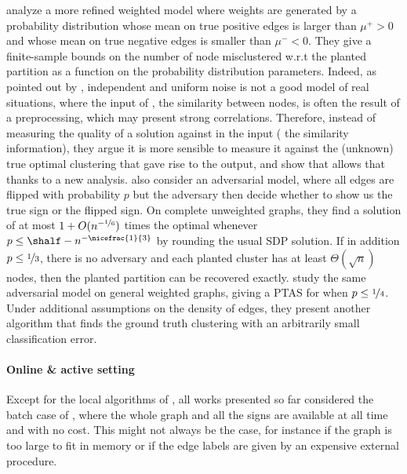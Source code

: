 \Textcite{Joachims2005} analyze a more refined weighted model where weights are generated by a
probability distribution whose mean on true positive edges is larger than $\mu^+>0$ and whose mean
on true negative edges is smaller than $\mu^-<0$. They give a finite-sample bounds on the number of
node misclustered w.r.t the planted partition as a function on the probability distribution
parameters. Indeed, as pointed out by \textcite{plantedAilon09}, independent and uniform noise is
not a good model of real situations, where the input of \pcc{}, \ie{} the similarity between nodes,
is often the result of a preprocessing, which may present strong correlations. Therefore, instead of
measuring the quality of a solution against in the input (\ie{} the similarity information), they
argue it is more sensible to measure it against the (unknown) true optimal clustering that gave rise
to the output, and show that \ccpivot{} allows that thanks to a new analysis. \Textcite{Mathieu2010}
also consider an adversarial model, where all edges are flipped with probability $p$ but the
adversary then decide whether to show us the true sign or the flipped sign. On complete unweighted
graphs, they find a solution of \mind{} at most $1 + O(n^{-\nicefrac{1}{6}})$ times the optimal
whenever $p \leq \shalf - n^{-\nicefrac{1}{3}}$ by rounding the usual SDP solution. If in addition
$p\leq\nicefrac{1}{3}$, there is no adversary and each planted cluster has at least
$\Theta(\sqrt{n})$ nodes, then the planted partition can be recovered exactly.
\Textcite{Makarychev2014} study the same adversarial model on general weighted graphs, giving a PTAS
for \mind{} when $p\leq \nicefrac{1}{4}$. Under additional assumptions on the density of edges, they
present another algorithm that finds the ground truth clustering with an arbitrarily small
classification error.


\paragraph{Online \& active setting}

Except for the local algorithms of \textcite{Bonchi2013}, all works presented so far considered the
batch case of \pcc{}, where the whole graph and all the signs are available at all time and with no
cost. This might not always be the case, for instance if the graph is too large to fit in memory or
if the edge labels are given by an expensive external procedure.

